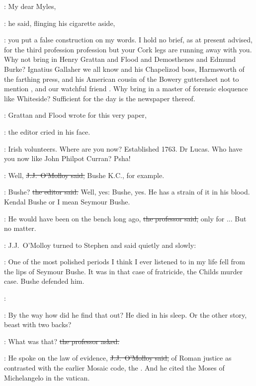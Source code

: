 \jjom:
My dear Myles,

:
he said,
flinging his cigarette aside,

\jjom:
you put a false construction on my words.
I hold no brief,
as at present advised,
for the third profession  profession
but your Cork legs are running away with you.
Why not bring in Henry Grattan and Flood and Demosthenes and Edmund Burke?
Ignatius Gallaher we all know
and his Chapelizod boss, Harmsworth of the farthing press,
and his American cousin of the Bowery guttersheet
not to mention ,
and our watchful friend .
Why bring in a master of forensic eloquence like Whiteside?
Sufficient for the day is the newspaper thereof.



\crawford:
Grattan and Flood wrote for this very paper,

:
the editor cried in his face.

\crawford:
Irish volunteers.
Where are you now?
Established 1763.
Dr Lucas.
Who have you now like John Philpot Curran?
Psha!

\jjom:
Well,
\sout{J.J.~O'Molloy said,}
Bushe K.C., for example.

\crawford:
Bushe?
\sout{the editor said.}
Well, yes:
Bushe, yes.
He has a strain of it in his blood.
Kendal Bushe or I mean Seymour Bushe.

\machugh:
He would have been on the bench long ago,
\sout{the professor said,}
only for ...
But no matter.

:
J.J.~O'Molloy turned to Stephen
and said quietly and slowly:

\jjom:
One of the most polished periods
I think I ever listened to in my life
fell from the lips of Seymour Bushe.
It was in that case of fratricide,
the Childs murder case.
Bushe defended him.

\StephenInt:
%

\StephenInt:
By the way how did he find that out?
He died in his sleep.
Or the other story,
beast with two backs?

\machugh:
What was that?
\sout{the professor asked.}



\jjom:
He spoke on the law of evidence,
\sout{J.J.~O'Molloy said,}
of Roman justice
as contrasted with the earlier Mosaic code,
the .
And he cited the Moses of Michelangelo in the vatican.

